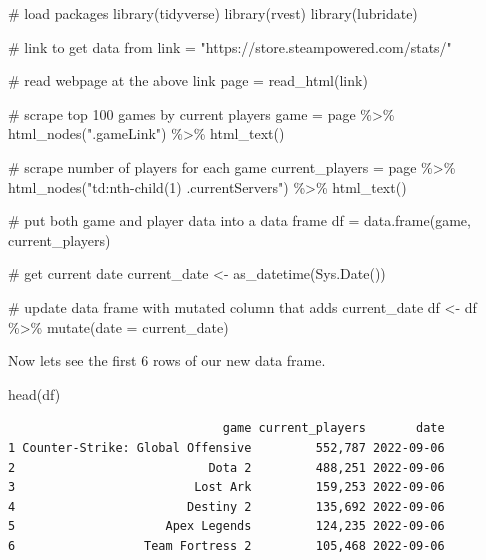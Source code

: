 \documentclass[
  letterpaper,
  DIV=11,
  numbers=noendperiod]{scrreprt}
\newenvironment{Shaded}{\begin{snugshade}}{\end{snugshade}}
\newcommand{\AttributeTok}[1]{\textcolor[rgb]{0.40,0.45,0.13}{#1}}
\newcommand{\CommentTok}[1]{\textcolor[rgb]{0.37,0.37,0.37}{#1}}
\newcommand{\FunctionTok}[1]{\textcolor[rgb]{0.28,0.35,0.67}{#1}}
\newcommand{\NormalTok}[1]{\textcolor[rgb]{0.00,0.23,0.31}{#1}}
\newcommand{\OtherTok}[1]{\textcolor[rgb]{0.00,0.23,0.31}{#1}}
\newcommand{\SpecialCharTok}[1]{\textcolor[rgb]{0.37,0.37,0.37}{#1}}
\newcommand{\StringTok}[1]{\textcolor[rgb]{0.13,0.47,0.30}{#1}}
\begin{document}
\begin{Shaded}
\begin{Highlighting}[]
\CommentTok{\# load packages}
\FunctionTok{library}\NormalTok{(tidyverse)}
\FunctionTok{library}\NormalTok{(rvest)}
\FunctionTok{library}\NormalTok{(lubridate)}

\CommentTok{\# link to get data from}
\NormalTok{link }\OtherTok{=} \StringTok{"https://store.steampowered.com/stats/"} 

\CommentTok{\# read webpage at the above link}
\NormalTok{page }\OtherTok{=} \FunctionTok{read\_html}\NormalTok{(link) }

\CommentTok{\# scrape top 100 games by current players}
\NormalTok{game }\OtherTok{=}\NormalTok{ page }\SpecialCharTok{\%\textgreater{}\%} \FunctionTok{html\_nodes}\NormalTok{(}\StringTok{".gameLink"}\NormalTok{) }\SpecialCharTok{\%\textgreater{}\%} \FunctionTok{html\_text}\NormalTok{()  }

\CommentTok{\# scrape number of players for each game }
\NormalTok{current\_players }\OtherTok{=}\NormalTok{ page }\SpecialCharTok{\%\textgreater{}\%} \FunctionTok{html\_nodes}\NormalTok{(}\StringTok{"td:nth{-}child(1) .currentServers"}\NormalTok{) }\SpecialCharTok{\%\textgreater{}\%} \FunctionTok{html\_text}\NormalTok{() }

\CommentTok{\# put both game and player data into a data frame}
\NormalTok{df }\OtherTok{=} \FunctionTok{data.frame}\NormalTok{(game, current\_players) }

\CommentTok{\# get current date}
\NormalTok{current\_date }\OtherTok{\textless{}{-}} \FunctionTok{as\_datetime}\NormalTok{(}\FunctionTok{Sys.Date}\NormalTok{())}

\CommentTok{\# update data frame with mutated column that adds current\_date}
\NormalTok{df }\OtherTok{\textless{}{-}}\NormalTok{ df }\SpecialCharTok{\%\textgreater{}\%} 
  \FunctionTok{mutate}\NormalTok{(}\AttributeTok{date =}\NormalTok{ current\_date)}
\end{Highlighting}
\end{Shaded}

Now lets see the first 6 rows of our new data frame.

\begin{Shaded}
\begin{Highlighting}[]
\FunctionTok{head}\NormalTok{(df)}
\end{Highlighting}
\end{Shaded}

\begin{verbatim}
                              game current_players       date
1 Counter-Strike: Global Offensive         552,787 2022-09-06
2                           Dota 2         488,251 2022-09-06
3                         Lost Ark         159,253 2022-09-06
4                        Destiny 2         135,692 2022-09-06
5                     Apex Legends         124,235 2022-09-06
6                  Team Fortress 2         105,468 2022-09-06
\end{verbatim}
\end{document}
